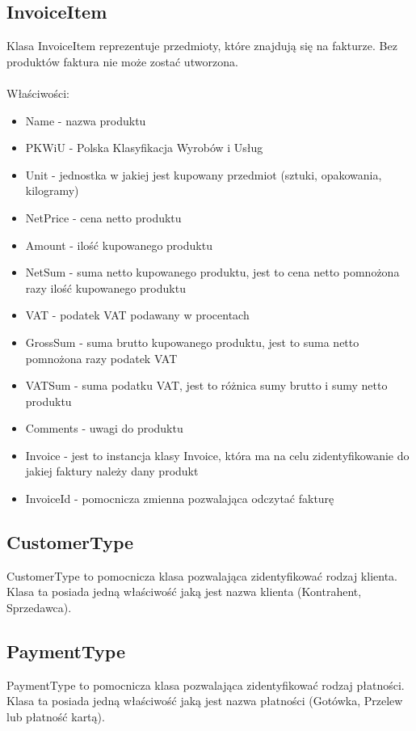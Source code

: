 \subsection{InvoiceItem}
Klasa InvoiceItem reprezentuje przedmioty, które znajdują się na fakturze. Bez produktów faktura nie może zostać utworzona.
\\\\
Właściwości:
\begin{itemize}
    \item Name - nazwa produktu
    \item PKWiU - Polska Klasyfikacja Wyrobów i Usług
    \item Unit - jednostka w jakiej jest kupowany przedmiot (sztuki, opakowania, kilogramy)
    \item NetPrice - cena netto produktu
    \item Amount - ilość kupowanego produktu
    \item NetSum - suma netto kupowanego produktu, jest to cena netto pomnożona razy ilość kupowanego produktu
    \item VAT - podatek VAT podawany w procentach
    \item GrossSum - suma brutto kupowanego produktu, jest to suma netto pomnożona razy podatek VAT
    \item VATSum - suma podatku VAT, jest to różnica sumy brutto i sumy netto produktu
    \item Comments - uwagi do produktu
    \item Invoice - jest to instancja klasy Invoice, która ma na celu zidentyfikowanie do jakiej faktury należy dany produkt
    \item InvoiceId - pomocnicza zmienna pozwalająca odczytać fakturę
\end{itemize}

\subsection{CustomerType}
CustomerType to pomocnicza klasa pozwalająca zidentyfikować rodzaj klienta. Klasa ta posiada jedną właściwość jaką jest nazwa klienta (Kontrahent, Sprzedawca).

\subsection{PaymentType}
PaymentType to pomocnicza klasa pozwalająca zidentyfikować rodzaj płatności. Klasa ta posiada jedną właściwość jaką jest nazwa płatności (Gotówka, Przelew lub płatność kartą).

